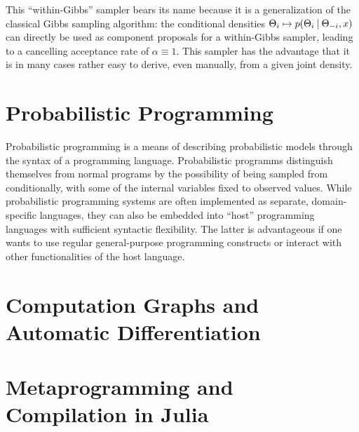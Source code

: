 This \enquote{within-Gibbs} sampler bears its name because it is a generalization of the classical
Gibbs sampling algorithm: the conditional densities
\(\Theta_{i} \mapsto p(\Theta_{i} \:\vert\: \Theta_{-i}, x)\) can directly be used as component
proposals for a within-Gibbs sampler, leading to a cancelling acceptance rate of
\(\alpha \equiv 1\).  This sampler has the advantage that it is in many cases rather easy to derive,
even manually, from a given joint density.


\section{Probabilistic Programming}
\label{sec:prob-prog}

Probabilistic programming is a means of describing probabilistic models through the syntax of a
programming language. Probabilistic programms distinguish themselves from normal programs by the
possibility of being sampled from conditionally, with some of the internal variables fixed to
observed values.  While probabilistic programming systems are often implemented as separate,
domain-specific languages, they can also be embedded into \enquote{host} programming languages with
sufficient syntactic flexibility.  The latter is advantageous if one wants to use regular
general-purpose programming constructs or interact with other functionalities of the host language.




\section{Computation Graphs and Automatic Differentiation}
\label{sec:graph-track-autom}


\section{Metaprogramming and Compilation in Julia}
\label{sec:metapr-comp-julia}




